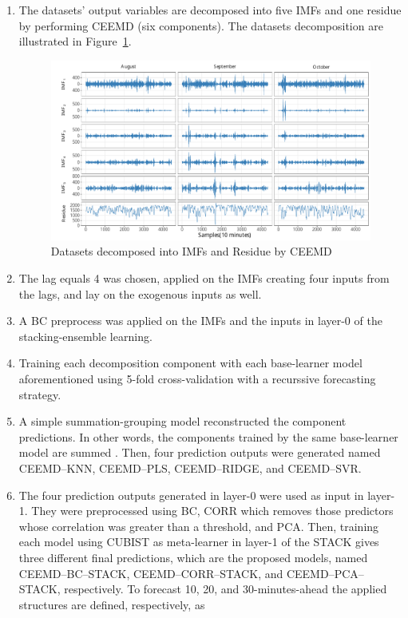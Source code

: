 \begin{enumerate}[start=1,label={\textbf{Step \arabic*:}},wide = 0pt, leftmargin = 3em]
\item The datasets' output variables are decomposed into five \ac{IMF}s and one residue by performing \ac{CEEMD} (six components). The datasets decomposition are illustrated in Figure~\ref{fig:IMFs}.

\begin{figure}[htb!]
    \centering
    \includegraphics[width=\linewidth]{Media/cs2_imf_plot}
    \caption{Datasets decomposed into IMFs and Residue by CEEMD}
    \label{fig:IMFs}
\end{figure}

\item The lag equals 4 was chosen, applied on the \ac{IMF}s creating four inputs from the lags, and lay on the exogenous inputs as well.

\item A \ac{BC} preprocess was applied on the \ac{IMF}s and the inputs in layer-0 of the stacking-ensemble learning.

\item Training each decomposition component with each base-learner model aforementioned using 5-fold cross-validation with a recurssive forecasting strategy.

\item A simple summation-grouping model reconstructed the component predictions. In other words, the components trained by the same base-learner model are summed \cite{dasilva2020Forecasting}. Then, four prediction outputs were generated named \ac{CEEMD}--\ac{KNN}, \ac{CEEMD}--\ac{PLS}, \ac{CEEMD}--\ac{RIDGE}, and \ac{CEEMD}--\ac{SVR}.

\item The four prediction outputs generated in layer-0 were used as input in layer-1. They were preprocessed using \ac{BC}, \ac{CORR} which removes those predictors whose correlation was greater than a threshold, and \ac{PCA}. Then, training each model using \ac{CUBIST} as meta-learner in layer-1 of the \ac{STACK} gives three different final predictions, which are the proposed models, named \ac{CEEMD}--\ac{BC}--\ac{STACK}, \ac{CEEMD}--\ac{CORR}--\ac{STACK}, and \ac{CEEMD}--\ac{PCA}--\ac{STACK}, respectively. To forecast 10, 20, and 30-minutes-ahead the applied structures are defined, respectively, as


\end{enumerate}
